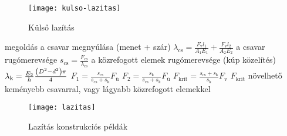 \begin{wrapfigure}{r}{.35\textwidth}
 \vspace{-3cm}
 \centering
 \texttt{[image: kulso-lazitas]}
 \caption{Külső lazítás}
\end{wrapfigure}
\parbox{.6\textwidth}{
\begin{outline}
	\1 megoldás
		\2 a csavar megnyúlása (menet + szár)
			$\lambda_\text{cs} = \frac{F_\text{v}l_1}{A_1E_1}+\frac{F_\text{v}l_2}{A_2E_2}$
		\2 a csavar rugómerevsége $s_\text{cs}=\frac{F_\text{cs}}{\lambda_\text{cs}}$
		\2 a közrefogott elemek rugómerevsége (kúp közelítés)
			$ \lambda_\text{k}=\frac{E_2}{h}\frac{\left(D^2-d^2\right)\pi}{4} $
		\2 $ F_1 = \frac{s_\text{cs}}{s_\text{cs}+s_\text{k}}F_\text{ü} $
		\2 $ F_2 = \frac{s_\text{k}}{s_\text{cs}+s_\text{k}}F_\text{ü} $
		\2 $ F_\text{krit} = \frac{s_\text{cs}+s_\text{k}}{s_\text{k}}F_\text{v} $
		\2 $F_\text{krit}$ növelhető keményebb csavarral, vagy lágyabb közrefogott elemekkel
\end{outline}}

\begin{figure}[H]
	\centering
	\texttt{[image: lazitas]}
	\caption{Lazítás konstrukciós példák}
\end{figure}
